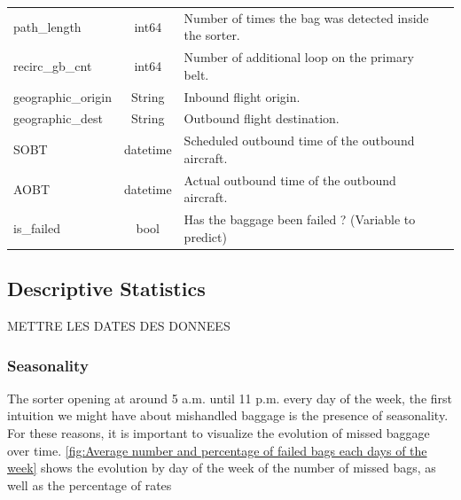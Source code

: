 \documentclass[12pt]{article}
\begin{document}
\begin{table}[ht]
\begin{tabularx}{\textwidth}{lclX}
        path\_length & int64 & Number of times the bag was detected inside the sorter. \\
        recirc\_gb\_cnt & int64 & Number of additional loop on the primary belt. \\
        geographic\_origin & String & Inbound flight origin. \\
        geographic\_dest & String & Outbound flight destination. \\
        SOBT & datetime & Scheduled outbound time of the outbound aircraft. \\
        AOBT & datetime & Actual outbound time of the outbound aircraft. \\
        is\_failed & bool & Has the baggage been failed ? (Variable to predict) \\
        
        \bottomrule
    \end{tabularx}
\end{table}
\FloatBarrier







\newpage
\subsection{Descriptive Statistics}

METTRE LES DATES DES DONNEES

\subsubsection{Seasonality}
The sorter opening at around 5 a.m. until 11 p.m. every day of the week, the first intuition we might have about mishandled baggage is the presence of seasonality.
For these reasons, it is important to visualize the evolution of missed baggage over time. \autoref{fig:Average number and percentage of failed bags each days of the week}
shows the evolution by day of the week of the number of missed bags, as well as the percentage of
rates
\end{document}
